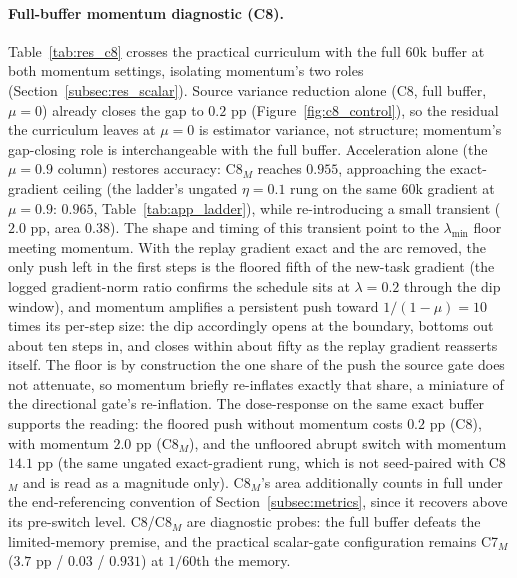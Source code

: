 \paragraph{Full-buffer momentum diagnostic (C8).} Table~\ref{tab:res_c8} crosses the practical curriculum with the full $60$k buffer at both momentum settings, isolating momentum's two roles (Section~\ref{subsec:res_scalar}). Source variance reduction alone (C8, full buffer, $\mu{=}0$) already closes the gap to $0.2$ pp (Figure~\ref{fig:c8_control}), so the residual the curriculum leaves at $\mu{=}0$ is estimator variance, not structure; momentum's gap-closing role is interchangeable with the full buffer. Acceleration alone (the $\mu{=}0.9$ column) restores accuracy: C8$_M$ reaches $0.955$, approaching the exact-gradient ceiling (the ladder's ungated $\eta = 0.1$ rung on the same $60$k gradient at $\mu{=}0.9$: $0.965$, Table~\ref{tab:app_ladder}), while re-introducing a small transient ($2.0$ pp, area $0.38$). The shape and timing of this transient point to the $\lambda_{\min}$ floor meeting momentum. With the replay gradient exact and the arc removed, the only push left in the first steps is the floored fifth of the new-task gradient (the logged gradient-norm ratio confirms the schedule sits at $\lambda = 0.2$ through the dip window), and momentum amplifies a persistent push toward $1/(1-\mu) = 10$ times its per-step size: the dip accordingly opens at the boundary, bottoms out about ten steps in, and closes within about fifty as the replay gradient reasserts itself. The floor is by construction the one share of the push the source gate does not attenuate, so momentum briefly re-inflates exactly that share, a miniature of the directional gate's re-inflation. The dose-response on the same exact buffer supports the reading: the floored push without momentum costs $0.2$ pp (C8), with momentum $2.0$ pp (C8$_M$), and the unfloored abrupt switch with momentum $14.1$ pp (the same ungated exact-gradient rung, which is not seed-paired with C8$_M$ and is read as a magnitude only). C8$_M$'s area additionally counts in full under the end-referencing convention of Section~\ref{subsec:metrics}, since it recovers above its pre-switch level. C8/C8$_M$ are diagnostic probes: the full buffer defeats the limited-memory premise, and the practical scalar-gate configuration remains C7$_M$ ($3.7$ pp / $0.03$ / $0.931$) at $1/60$th the memory.

